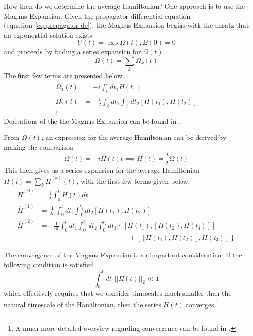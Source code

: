 How then do we determine the average Hamiltonian? One approach is to use the Magnus Expansion.\cite{Blanes_2009,2010EJPh...31..907B} Given the propagator differential equation (equation~\ref{eq:propagator-de}), the Magnus Expansion begins with the ansatz that an exponential solution exists
\[
U(t) = \exp{\Omega(t)}, \Omega(0) = 0
\]
and proceeds by finding a series expansion for $\Omega(t)$
\[
\Omega(t) = \sum_k \Omega_k(t)
\]
The first few terms are presented below
\begin{align*}
    \Omega_1(t) &= -i \int_0^t dt_1 H(t_1) \\
    \Omega_2(t) &= -\frac{1}{2} \int_0^t dt_1 \int_0^{t_1} dt_2 [H(t_1), H(t_2)] \\
    \vdots
\end{align*}
Derivations of the the Magnus Expansion can be found in
\cite{gerstein-dybowski,Blanes_2009,2010EJPh...31..907B}.

From $\Omega(t)$, an expression for the average Hamiltonian can be derived by making the comparison
\[
\Omega(t) = -i \overline{H}(t) t \implies \overline{H}(t) = \frac{i}{t} \Omega(t)
\]
This then gives us a series expansion for the average Hamiltonian $\overline{H}(t) = \sum_k \overline{H}^{(k)}(t)$, with the first few terms given below.
\begin{align}\label{eq:AHT-terms}
    \overline{H}^{(0)} &= \frac{1}{t} \int_0^{t}
        H(t) dt \\
    \overline{H}^{(1)} &= \frac{1}{2it} \int_0^{t} dt_1 \int_0^{t_1} dt_2
        \left[H(t_1), H(t_2)\right] \\
    \overline{H}^{(2)} &= -\frac{1}{6t}
    \int_0^{t} dt_1 \int_0^{t_1} dt_2 \int_0^{t_2} dt_3
    \left\{
    \left[H(t_1), \left[H(t_2), H(t_3)\right]\right] \right. \\
    & \hspace{13em} + \left.
    \left[\left[H(t_1), H(t_2)\right], H(t_3)\right]
    \right\}
\end{align}

The convergence of the Magnus Expansion is an important consideration. If the following condition is satisfied
\begin{equation}\label{eq:AHT-convergence}
    \int_0^t dt_1 ||H(t)||_2 \ll 1
\end{equation}
which effectively requires that we consider timescales much smaller than the natural timescale of the Hamiltonian, then the series $\overline{H}(t)$ converges.\footnote{A much more detailed overview regarding convergence can be found in \cite{Blanes_2009}.}


